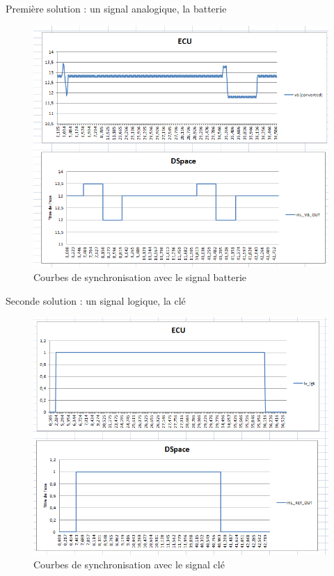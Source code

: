\documentclass{beamer}
\begin{document}
	\begin{frame}{\normalsize Première solution : un signal analogique, la batterie}		
\begin{figure}
\centering
\includegraphics[width=0.9\linewidth]{images/sync1}
\caption{Courbes de synchronisation avec le signal batterie}
\label{fig:sync1}
\end{figure}
	\end{frame}
	\begin{frame}{\normalsize Seconde solution : un signal logique, la clé}		
		\begin{figure}
		\centering
		\includegraphics[width=0.9\linewidth]{images/sync2}
		\caption{Courbes de synchronisation avec le signal clé}
		\label{fig:sync2}
		\end{figure}		
	\end{frame}
\end{document}
